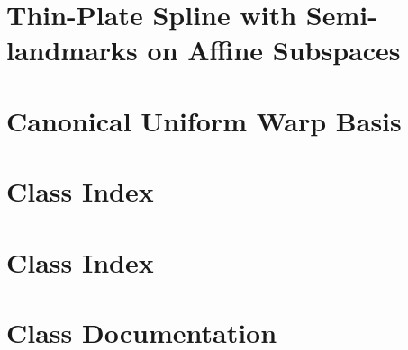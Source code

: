 \documentclass[letterpaper]{article}
\begin{document}
\section{Thin-\/Plate Spline with Semi-\/landmarks on Affine Subspaces}
\label{semilandmarks}
\hypertarget{semilandmarks}{}

\section{Canonical Uniform Warp Basis}
\label{uniform_warps}
\hypertarget{uniform_warps}{}

\section{Class Index}

\section{Class Index}

\section{Class Documentation}





































\printindex
\end{document}
